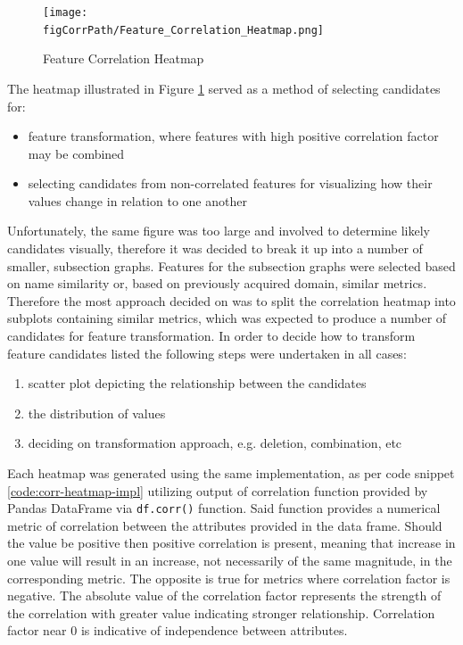 \begin{figure}
    \texttt{[image: \\figCorrPath/Feature\_Correlation\_Heatmap.png]}
    \caption{Feature Correlation Heatmap}
    \label{fig:correlation-all-features}
\end{figure}


The heatmap illustrated in Figure \ref{fig:correlation-all-features} served as a method of selecting candidates for:
\begin{itemize}
    \item feature transformation, where features with high positive correlation factor may be combined 
    \item selecting candidates from non-correlated features for visualizing how their values change in relation to one another
\end{itemize}

Unfortunately, the same figure was too large and involved to determine likely candidates visually, therefore it was decided to break it up into a number of smaller, subsection graphs. Features for the subsection graphs were selected based on name similarity or, based on previously acquired domain, similar metrics.
Therefore the most approach decided on was to split the correlation heatmap into subplots containing similar metrics, which was expected to produce a number of candidates for feature transformation. In order to decide how to transform feature candidates listed the following steps were undertaken in all cases:
\begin{enumerate}
    \item scatter plot depicting the relationship between the candidates
    \item the distribution of values 
    \item deciding on transformation approach, e.g. deletion, combination, etc
\end{enumerate}
Each heatmap was generated using the same implementation, as per code snippet \ref{code:corr-heatmap-impl} utilizing output of correlation function provided by Pandas DataFrame via \texttt{df.corr()} function. Said function provides a numerical metric of correlation between the attributes provided in the data frame. Should the value be positive then positive correlation is present, meaning that increase in one value will result in an increase, not necessarily of the same magnitude, in the corresponding metric. The opposite is true for metrics where correlation factor is negative. The absolute value of the correlation factor represents the strength of the correlation with greater value indicating stronger relationship. Correlation factor near 0 is indicative of independence between attributes.

